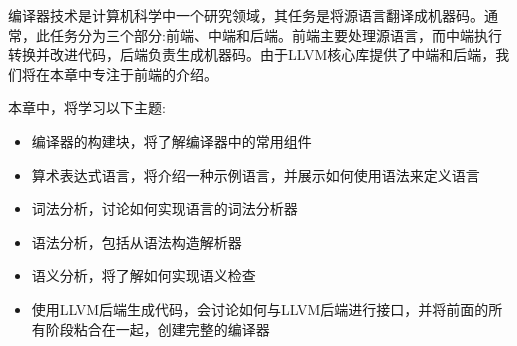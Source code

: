 编译器技术是计算机科学中一个研究领域，其任务是将源语言翻译成机器码。通常，此任务分为三个部分:前端、中端和后端。前端主要处理源语言，而中端执行转换并改进代码，后端负责生成机器码。由于LLVM核心库提供了中端和后端，我们将在本章中专注于前端的介绍。

本章中，将学习以下主题:

\begin{itemize}
\item
编译器的构建块，将了解编译器中的常用组件

\item
算术表达式语言，将介绍一种示例语言，并展示如何使用语法来定义语言

\item
词法分析，讨论如何实现语言的词法分析器

\item
语法分析，包括从语法构造解析器

\item
语义分析，将了解如何实现语义检查

\item
使用LLVM后端生成代码，会讨论如何与LLVM后端进行接口，并将前面的所有阶段粘合在一起，创建完整的编译器
\end{itemize}












